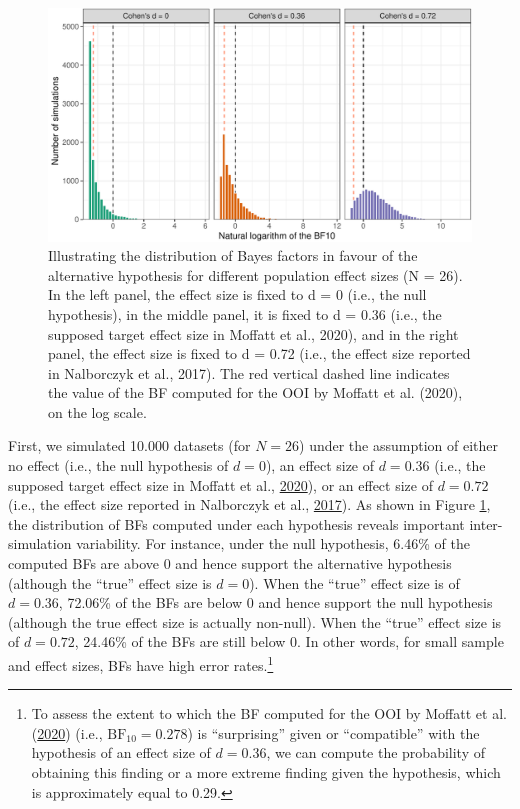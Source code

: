 \documentclass[
  english,
  man, donotrepeattitle,floatsintext]{apa6}
\begin{document}
\begin{figure}[!htb]

{\centering \includegraphics[width=1\linewidth]{manuscript_files/figure-latex/bf-dance-1} 

}

\caption{Illustrating the distribution of Bayes factors in favour of the alternative hypothesis for different population effect sizes (N = 26). In the left panel, the effect size is fixed to d = 0 (i.e., the null hypothesis), in the middle panel, it is fixed to d = 0.36 (i.e., the supposed target effect size in Moffatt et al., 2020), and in the right panel, the effect size is fixed to d = 0.72 (i.e., the effect size reported in Nalborczyk et al., 2017). The red vertical dashed line indicates the value of the BF computed for the OOI by Moffatt et al. (2020), on the log scale.}\label{fig:bf-dance}
\end{figure}

First, we simulated 10.000 datasets (for \(N = 26\)) under the assumption of either no effect (i.e., the null hypothesis of \(d = 0\)), an effect size of \(d = 0.36\) (i.e., the supposed target effect size in Moffatt et al., \protect\hyperlink{ref-moffatt_inner_2020}{2020}), or an effect size of \(d = 0.72\) (i.e., the effect size reported in Nalborczyk et al., \protect\hyperlink{ref-nalborczyk_orofacial_2017}{2017}). As shown in Figure \ref{fig:bf-dance}, the distribution of BFs computed under each hypothesis reveals important inter-simulation variability. For instance, under the null hypothesis, 6.46\% of the computed BFs are above 0 and hence support the alternative hypothesis (although the ``true'' effect size is \(d = 0\)). When the ``true'' effect size is of \(d = 0.36\), 72.06\% of the BFs are below 0 and hence support the null hypothesis (although the true effect size is actually non-null). When the ``true'' effect size is of \(d = 0.72\), 24.46\% of the BFs are still below 0. In other words, for small sample and effect sizes, BFs have high error rates.\footnote{To assess the extent to which the BF computed for the OOI by Moffatt et al. (\protect\hyperlink{ref-moffatt_inner_2020}{2020}) (i.e., \(\text{BF}_{10} = 0.278\)) is ``surprising'' given or ``compatible'' with the hypothesis of an effect size of \(d = 0.36\), we can compute the probability of obtaining this finding or a more extreme finding given the hypothesis, which is approximately equal to 0.29.}
\end{document}
